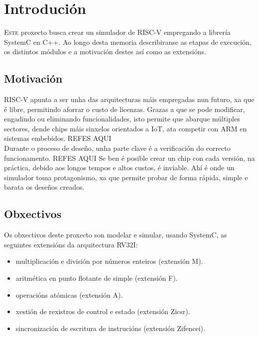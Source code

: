 \chapter{Introdución}
\label{chap:introducion}

\lettrine{E}{ste} proxecto busca crear un simulador de RISC-V empregando a librería SystemC en C++. Ao longo desta memoria describiranse as etapas de execución, os distintos módulos e a motivación destes así como as extensións.




\section{Motivación}
\label{sec:motivación}
RISC-V apunta a ser unha das arquitecturas máis empregadas nun futuro, xa que é libre, permitindo aforrar o custo de licenzas. Grazas a que se pode modificar, engadindo ou eliminando funcionalidades, isto permite que abarque múltiples sectores, dende chips máis sinxelos orientados a IoT, ata competir con ARM en sistemas embebidos. REFES AQUI\\
Durante o proceso de deseño, unha parte clave é a verificación do correcto funcionamento. REFES AQUI Se ben é posible crear un chip con cada versión, na práctica, debido aos longos tempos e altos custos, é inviable. Ahí é onde un simulador toma protagonismo, xa que permite probar de forma rápida, simple e barata os deseños creados. 

\section{Obxectivos}
\label{sec:obxectivos}
Os obxectivos deste proxecto son modelar e simular, usando SystemC, as seguintes extensións da arquitectura RV32I: 

\begin{itemize}
    \item multiplicación e división por números enteiros (extensión M).
    \item aritmética en punto flotante de simple (extensión F).
    \item  operacións atómicas  (extensión A).
    \item  xestión de rexistros de control e estado (extensión Zicsr).
    \item sincronización de escritura de instrucións (extensión Zifencei).
\end{itemize}

